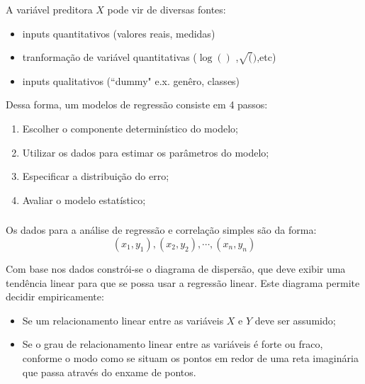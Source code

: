 \documentclass[14pt,aspectratio=1610]{beamer}
\begin{document}
\begin{frame}{}
\frametitle{ }
\begin{block}{}
\justifying
A variável preditora $X$ pode vir de diversas fontes:
\begin{itemize}
\item inputs quantitativos (valores reais, medidas)
\item tranformação de variável quantitativas ($\log()$ ,$\sqrt()$,etc)
\item inputs qualitativos (``dummy" e.x. genêro, classes)
\end{itemize}
Dessa forma, um modelos de regressão consiste em 4 passos:
\begin{enumerate}
\item Escolher o componente determinístico do modelo;\pause
\item Utilizar os dados para estimar os parâmetros do modelo;\pause
\item Especificar a distribuição do erro;\pause
\item Avaliar o modelo estatístico;
\end{enumerate}
\end{block}
\end{frame}


\begin{frame}{}
\frametitle{ }
\begin{block}{}
\justifying
Os dados para a análise de regressão e correlação simples são da forma:
$$(x_{1},y_{1}),(x_{2},y_{2}),\cdots, (x_{n},y_{n})$$

Com base nos dados constrói-se o diagrama de dispersão, que deve exibir
uma tendência linear para que se possa usar a regressão linear.
Este diagrama permite decidir empiricamente:
\begin{itemize}
\item Se um relacionamento linear entre as variáveis $X$ e $Y$ deve ser assumido;
\item Se o grau de relacionamento linear entre as variáveis é forte ou fraco,
conforme o modo como se situam os pontos em redor de uma reta imaginária que passa através do enxame de pontos.
\end{itemize}
\end{block}
\end{frame}
\end{document}
